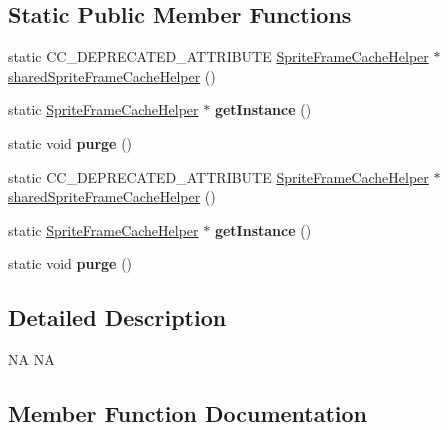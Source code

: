 \subsection*{Static Public Member Functions}
\begin{DoxyCompactItemize}
\item 
static C\+C\+\_\+\+D\+E\+P\+R\+E\+C\+A\+T\+E\+D\+\_\+\+A\+T\+T\+R\+I\+B\+U\+TE \hyperlink{classcocostudio_1_1SpriteFrameCacheHelper}{Sprite\+Frame\+Cache\+Helper} $\ast$ \hyperlink{classcocostudio_1_1SpriteFrameCacheHelper_ab95d3824bcdb2434d7b238b0b032280c}{shared\+Sprite\+Frame\+Cache\+Helper} ()
\item 
\mbox{\label{classcocostudio_1_1SpriteFrameCacheHelper_a54eacb7936c17564f8e0945d4c91441f}} 
static \hyperlink{classcocostudio_1_1SpriteFrameCacheHelper}{Sprite\+Frame\+Cache\+Helper} $\ast$ {\bfseries get\+Instance} ()
\item 
\mbox{\label{classcocostudio_1_1SpriteFrameCacheHelper_ad625a4d71e0bd93ea189f0657ea18933}} 
static void {\bfseries purge} ()
\item 
static C\+C\+\_\+\+D\+E\+P\+R\+E\+C\+A\+T\+E\+D\+\_\+\+A\+T\+T\+R\+I\+B\+U\+TE \hyperlink{classcocostudio_1_1SpriteFrameCacheHelper}{Sprite\+Frame\+Cache\+Helper} $\ast$ \hyperlink{classcocostudio_1_1SpriteFrameCacheHelper_ab95d3824bcdb2434d7b238b0b032280c}{shared\+Sprite\+Frame\+Cache\+Helper} ()
\item 
\mbox{\label{classcocostudio_1_1SpriteFrameCacheHelper_ab6f444100e1c10c8b23dbd8c47204474}} 
static \hyperlink{classcocostudio_1_1SpriteFrameCacheHelper}{Sprite\+Frame\+Cache\+Helper} $\ast$ {\bfseries get\+Instance} ()
\item 
\mbox{\label{classcocostudio_1_1SpriteFrameCacheHelper_aa698d8cc63590ee1d5462bff6d41946b}} 
static void {\bfseries purge} ()
\end{DoxyCompactItemize}


\subsection{Detailed Description}
NA  NA 

\subsection{Member Function Documentation}
\mbox{\label{classcocostudio_1_1SpriteFrameCacheHelper_ab95d3824bcdb2434d7b238b0b032280c}} 

